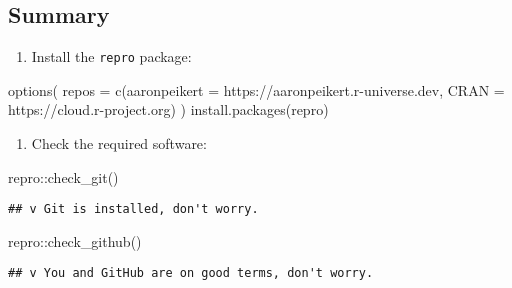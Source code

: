 \documentclass[psych,tutorial,submit,moreauthors,pdftex]{mdpi}
\providecommand{\tightlist}{%
  \setlength{\itemsep}{0pt}\setlength{\parskip}{4pt}}
\newenvironment{Shaded}{\begin{snugshade}}{\end{snugshade}}
\newcommand{\AttributeTok}[1]{\textcolor[rgb]{0.77,0.63,0.00}{#1}}
\newcommand{\FunctionTok}[1]{\textcolor[rgb]{0.00,0.00,0.00}{#1}}
\newcommand{\NormalTok}[1]{#1}
\newcommand{\SpecialCharTok}[1]{\textcolor[rgb]{0.00,0.00,0.00}{#1}}
\newcommand{\StringTok}[1]{\textcolor[rgb]{0.31,0.60,0.02}{#1}}
\begin{document}
\hypertarget{summary}{%
\subsection{Summary}\label{summary}}

\begin{enumerate}
\def\labelenumi{\arabic{enumi}.}
\tightlist
\item
  Install the \texttt{repro} package:
\end{enumerate}

\begin{Shaded}
\begin{Highlighting}[]
\FunctionTok{options}\NormalTok{(}
  \AttributeTok{repos =} \FunctionTok{c}\NormalTok{(}\AttributeTok{aaronpeikert =} \StringTok{\textquotesingle{}https://aaronpeikert.r{-}universe.dev\textquotesingle{}}\NormalTok{,}
            \AttributeTok{CRAN =} \StringTok{\textquotesingle{}https://cloud.r{-}project.org\textquotesingle{}}\NormalTok{)}
\NormalTok{)}
\FunctionTok{install.packages}\NormalTok{(}\StringTok{\textquotesingle{}repro\textquotesingle{}}\NormalTok{)}
\end{Highlighting}
\end{Shaded}

\begin{enumerate}
\def\labelenumi{\arabic{enumi}.}
\setcounter{enumi}{1}
\tightlist
\item
  Check the required software:
\end{enumerate}

\begin{Shaded}
\begin{Highlighting}[]
\NormalTok{repro}\SpecialCharTok{::}\FunctionTok{check\_git}\NormalTok{()}
\end{Highlighting}
\end{Shaded}

\begin{verbatim}
## v Git is installed, don't worry.
\end{verbatim}

\begin{Shaded}
\begin{Highlighting}[]
\NormalTok{repro}\SpecialCharTok{::}\FunctionTok{check\_github}\NormalTok{()}
\end{Highlighting}
\end{Shaded}

\begin{verbatim}
## v You and GitHub are on good terms, don't worry.
\end{verbatim}
\end{document}

